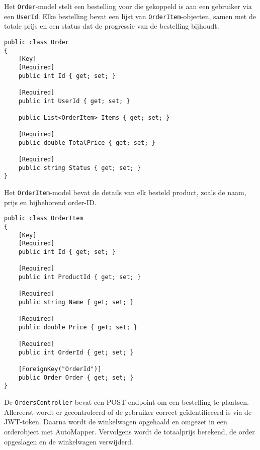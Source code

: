 \medskip
Het \texttt{Order}-model stelt een bestelling voor die gekoppeld is aan een gebruiker via een \texttt{UserId}. Elke bestelling bevat een lijst van \texttt{OrderItem}-objecten, samen met de totale prijs en een status dat de progressie van de bestelling bijhoudt.
\medskip

\begin{lstlisting}[style=mystyleA, caption=Order.cs, label=lst:MonoOrderModel]
public class Order
{
	[Key]
	[Required]
	public int Id { get; set; }
	
	[Required]
	public int UserId { get; set; }
	
	public List<OrderItem> Items { get; set; }
	
	[Required]
	public double TotalPrice { get; set; }
	
	[Required]
	public string Status { get; set; }
}
\end{lstlisting}

\medskip
Het \texttt{OrderItem}-model bevat de details van elk besteld product, zoals de naam, prijs en bijbehorend order-ID.
\medskip

\begin{lstlisting}[style=mystyleA, caption=OrderItem.cs, label=lst:MonoOrderItemModel]
public class OrderItem
{
	[Key]
	[Required]
	public int Id { get; set; }
	
	[Required]
	public int ProductId { get; set; }
	
	[Required]
	public string Name { get; set; }
	
	[Required]
	public double Price { get; set; }
	
	[Required]
	public int OrderId { get; set; }
	
	[ForeignKey("OrderId")]
	public Order Order { get; set; }
}
\end{lstlisting}

\medskip
De \texttt{OrdersController} bevat een POST-endpoint om een bestelling te plaatsen. Allereerst wordt er gecontroleerd of de gebruiker correct geïdentificeerd is via de JWT-token. Daarna wordt de winkelwagen opgehaald en omgezet in een orderobject met AutoMapper. Vervolgens wordt de totaalprijs berekend, de order opgeslagen en de winkelwagen verwijderd.
\medskip

